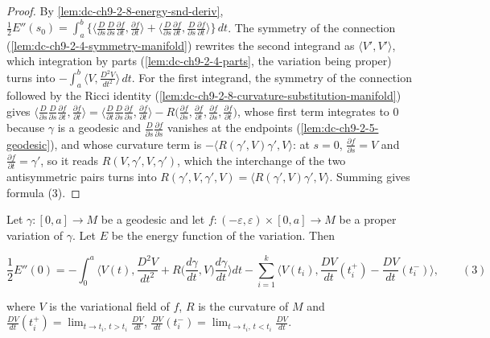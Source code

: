 \begin{proof}

  \sketch
  By \cref{lem:dc-ch9-2-8-energy-snd-deriv},
  $\frac12 E''(s_0)=\int_a^b\{\langle\frac{D}{\partial s}\frac{D}{\partial s}\frac{\partial f}{\partial t},\frac{\partial f}{\partial t}\rangle+\langle\frac{D}{\partial s}\frac{\partial f}{\partial t},\frac{D}{\partial s}\frac{\partial f}{\partial t}\rangle\}\,dt$.
  The symmetry of the connection (\cref{lem:dc-ch9-2-4-symmetry-manifold}) rewrites the second
  integrand as $\langle V',V'\rangle$, which integration by parts
  (\cref{lem:dc-ch9-2-4-parts}, the variation being proper) turns into
  $-\int_a^b\langle V,\frac{D^2V}{dt^2}\rangle\,dt$. For the first integrand, the symmetry of
  the connection followed by the Ricci identity
  (\cref{lem:dc-ch9-2-8-curvature-substitution-manifold}) gives
  $\langle\frac{D}{\partial s}\frac{D}{\partial s}\frac{\partial f}{\partial t},\frac{\partial f}{\partial t}\rangle
    =\langle\frac{D}{\partial t}\frac{D}{\partial s}\frac{\partial f}{\partial s},\frac{\partial f}{\partial t}\rangle
     -R\big(\tfrac{\partial f}{\partial s},\tfrac{\partial f}{\partial t},\tfrac{\partial f}{\partial s},\tfrac{\partial f}{\partial t}\big)$,
  whose first term integrates to $0$ because $\gamma$ is a geodesic and
  $\frac{D}{\partial s}\frac{\partial f}{\partial s}$ vanishes at the endpoints
  (\cref{lem:dc-ch9-2-5-geodesic}), and whose curvature term is $-\langle R(\gamma',V)\gamma',V\rangle$:
  at $s=0$, $\frac{\partial f}{\partial s}=V$ and $\frac{\partial f}{\partial t}=\gamma'$, so it reads
  $R(V,\gamma',V,\gamma')$, which the interchange of the two antisymmetric pairs turns into
  $R(\gamma',V,\gamma',V)=\langle R(\gamma',V)\gamma',V\rangle$.
  Summing gives formula (3).
\end{proof}
\begin{proposition}
  \label{prop:dc-ch9-2-8}
  Let $\gamma:[0,a]\to M$ be a geodesic and let
  $f:(-\varepsilon,\varepsilon)\times[0,a]\to M$ be a proper variation of $\gamma$. Let $E$
  be the energy function of the variation. Then

  $$
  \frac{1}{2}E''(0)=-\int_0^a\Big\langle V(t),\frac{D^2 V}{dt^2}+R\Big(\frac{d\gamma}{dt},V\Big)\frac{d\gamma}{dt}\Big\rangle dt-\sum_{i=1}^k\Big\langle V(t_i),\frac{DV}{dt}(t_i^+)-\frac{DV}{dt}(t_i^-)\Big\rangle,\qquad(3)
  $$

  where $V$ is the variational field of $f$, $R$ is the curvature of $M$ and
  $\frac{DV}{dt}(t_i^+)=\lim_{t\to t_i,\,t>t_i}\frac{DV}{dt}$,
  $\frac{DV}{dt}(t_i^-)=\lim_{t\to t_i,\,t<t_i}\frac{DV}{dt}$.
\end{proposition}

